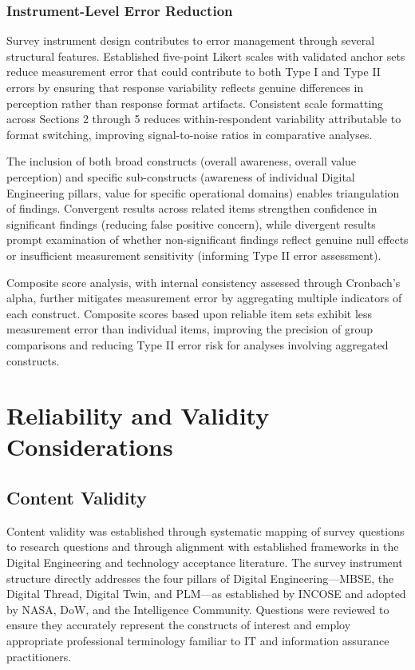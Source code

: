 \subsubsection{Instrument-Level Error Reduction}

Survey instrument design contributes to error management through several structural features. Established five-point Likert scales with validated anchor sets reduce measurement error that could contribute to both Type I and Type II errors by ensuring that response variability reflects genuine differences in perception rather than response format artifacts. Consistent scale formatting across Sections 2 through 5 reduces within-respondent variability attributable to format switching, improving signal-to-noise ratios in comparative analyses.

The inclusion of both broad constructs (overall awareness, overall value perception) and specific sub-constructs (awareness of individual Digital Engineering pillars, value for specific operational domains) enables triangulation of findings. Convergent results across related items strengthen confidence in significant findings (reducing false positive concern), while divergent results prompt examination of whether non-significant findings reflect genuine null effects or insufficient measurement sensitivity (informing Type II error assessment).

Composite score analysis, with internal consistency assessed through Cronbach's alpha, further mitigates measurement error by aggregating multiple indicators of each construct. Composite scores based upon reliable item sets exhibit less measurement error than individual items, improving the precision of group comparisons and reducing Type II error risk for analyses involving aggregated constructs.

\section{Reliability and Validity Considerations}

\subsection{Content Validity}

Content validity was established through systematic mapping of survey questions to research questions and through alignment with established frameworks in the Digital Engineering and technology acceptance literature. The survey instrument structure directly addresses the four pillars of Digital Engineering---MBSE, the Digital Thread, Digital Twin, and PLM---as established by INCOSE and adopted by NASA, DoW, and the Intelligence Community. Questions were reviewed to ensure they accurately represent the constructs of interest and employ appropriate professional terminology familiar to IT and information assurance practitioners.

